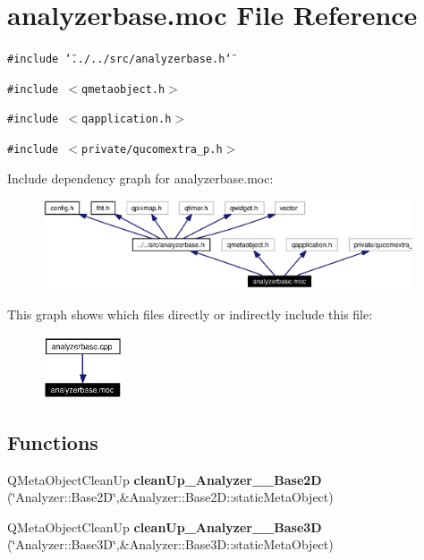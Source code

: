 \section{analyzerbase.moc File Reference}
\label{analyzerbase_8moc}


{\tt \#include \char`\"{}../../src/analyzerbase.h\char`\"{}}\par
{\tt \#include $<$qmetaobject.h$>$}\par
{\tt \#include $<$qapplication.h$>$}\par
{\tt \#include $<$private/qucomextra\_\-p.h$>$}\par


Include dependency graph for analyzerbase.moc:\begin{figure}[H]
\begin{center}
\leavevmode
\includegraphics[width=310pt]{analyzerbase_8moc__incl}
\end{center}
\end{figure}


This graph shows which files directly or indirectly include this file:\begin{figure}[H]
\begin{center}
\leavevmode
\includegraphics[width=67pt]{analyzerbase_8moc__dep__incl}
\end{center}
\end{figure}
\subsection*{Functions}
\begin{CompactItemize}
\item 
QMeta\-Object\-Clean\-Up {\bf clean\-Up\_\-Analyzer\_\-\_\-Base2D} (\char`\"{}Analyzer::Base2D\char`\"{},\&Analyzer::Base2D::static\-Meta\-Object)
\item 
QMeta\-Object\-Clean\-Up {\bf clean\-Up\_\-Analyzer\_\-\_\-Base3D} (\char`\"{}Analyzer::Base3D\char`\"{},\&Analyzer::Base3D::static\-Meta\-Object)
\end{CompactItemize}


